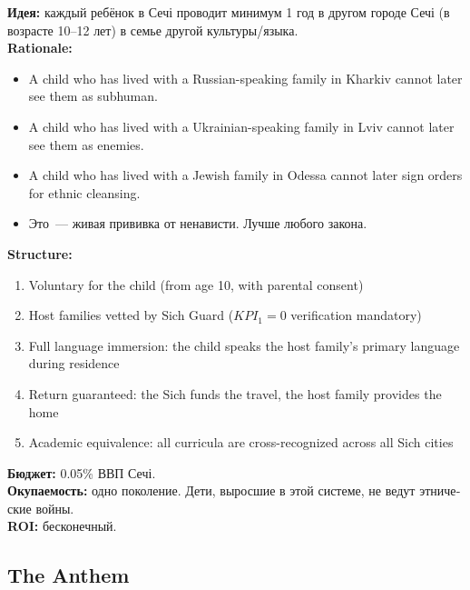 \documentclass[11pt,a4paper]{article}
\theoremstyle{definition}
\theoremstyle{remark}
\begin{document}
\begin{kpibox}

\foreignlanguage{russian}{
\textbf{Идея:} каждый ребёнок в Сечі проводит
минимум 1 год в другом городе Сечі
(в возрасте 10--12 лет) в семье другой культуры/языка.\\[0.2cm]
}
\textbf{Rationale:}
\begin{itemize}[noitemsep]
  \item A child who has lived with a Russian-speaking family
    in Kharkiv cannot later see them as subhuman.
  \item A child who has lived with a Ukrainian-speaking family
    in Lviv cannot later see them as enemies.
  \item A child who has lived with a Jewish family
    in Odessa cannot later sign orders for ethnic cleansing.
  \item \foreignlanguage{russian}{
    Это~--- живая прививка от ненависти.
    Лучше любого закона.}
\end{itemize}

\vspace{0.2cm}
\textbf{Structure:}
\begin{enumerate}[noitemsep, leftmargin=1.5cm]
  \item Voluntary for the child (from age 10, with parental consent)
  \item Host families vetted by Sich Guard
    ($KPI_1 = 0$ verification mandatory)
  \item Full language immersion: the child speaks the host family's
    primary language during residence
  \item Return guaranteed: the Sich funds the travel,
    the host family provides the home
  \item Academic equivalence: all curricula are cross-recognized
    across all Sich cities
\end{enumerate}

\vspace{0.2cm}
\foreignlanguage{russian}{
\textbf{Бюджет:} 0.05\% ВВП Сечі.\\
\textbf{Окупаемость:} одно поколение.
Дети, выросшие в этой системе, не ведут этнические войны.\\
\textbf{ROI:} бесконечный.
}
\end{kpibox}

\subsection{The Anthem}
\label{sec:sich-anthem}
\end{document}
